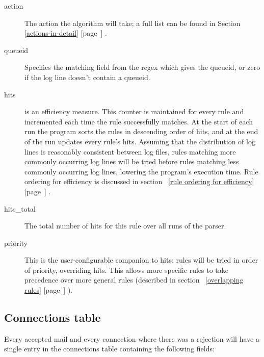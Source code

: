 \documentclass[a4paper,12pt,draft]{article}
\newcommand{\refwithpage}[1]{%
    \empty{}\ref{#1} [page~\pageref{#1}]%
}
\begin{document}
\begin{description}
    \item [action] The action the algorithm will take; a full list can be
        found in Section~\refwithpage{actions-in-detail}.

    \item [queueid] Specifies the matching field from the regex which gives
        the queueid, or zero if the log line doesn't contain a queueid.

    \item [hits] is an efficiency measure.  This counter is maintained for
        every rule and incremented each time the rule successfully matches.
        At the start of each run the program sorts the rules in descending
        order of hits, and at the end of the run updates every rule's hits.
        Assuming that the distribution of log lines is reasonably
        consistent between log files, rules matching more commonly
        occurring log lines will be tried before rules matching less
        commonly occurring log lines, lowering the program's execution
        time.  Rule ordering for efficiency is discussed in
        section~\refwithpage{rule ordering for efficiency}.

    \item [hits\_total] The total number of hits for this rule over all
        runs of the parser.

    \item [priority] This is the user-configurable companion to hits: rules
        will be tried in order of priority, overriding hits.  This allows
        more specific rules to take precedence over more general rules
        (described in section~\refwithpage{overlapping rules}).

\end{description}


\subsection{Connections table}

\label{connections table}

Every accepted mail and every connection where there was a rejection will
have a single entry in the connections table containing the following
fields:
\end{document}
